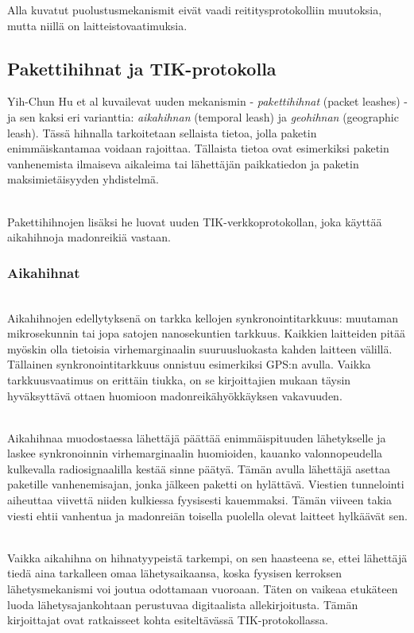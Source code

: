 \documentclass[finnish]{tktltiki2}
\theoremstyle{definition}
\theoremstyle{remark}
\begin{document}
Alla kuvatut puolustusmekanismit eivät vaadi reititysprotokolliin muutoksia, mutta niillä on laitteistovaatimuksia.

% 
% 
% 
% 
% 
% 
% 
% 

\subsection{Pakettihihnat ja TIK-protokolla}
\label{packetleashes}
% 
% 
% 
% 
% 
% 
% 
% 
% 
% 
Yih-Chun Hu et al \cite{leashes} kuvailevat uuden mekanismin - \emph{pakettihihnat} (packet leashes) - ja sen kaksi eri varianttia: \emph{aikahihnan} (temporal leash) ja \emph{geohihnan} (geographic leash). Tässä hihnalla tarkoitetaan sellaista tietoa, jolla paketin enimmäiskantamaa voidaan rajoittaa. Tällaista tietoa ovat esimerkiksi paketin vanhenemista ilmaiseva aikaleima tai lähettäjän paikkatiedon ja paketin maksimietäisyyden yhdistelmä.

\noindent \\
Pakettihihnojen lisäksi he luovat uuden TIK-verkkoprotokollan, joka käyttää aikahihnoja madonreikiä vastaan.

\subsubsection{Aikahihnat} 
\noindent \\
Aikahihnojen edellytyksenä on tarkka kellojen synkronointitarkkuus: muutaman mikrosekunnin tai jopa satojen nanosekuntien tarkkuus. Kaikkien laitteiden pitää myöskin olla tietoisia virhemarginaalin suuruusluokasta kahden laitteen välillä. Tällainen synkronointitarkkuus onnistuu esimerkiksi GPS:n avulla. Vaikka tarkkuusvaatimus on erittäin tiukka, on se kirjoittajien mukaan täysin hyväksyttävä ottaen huomioon madonreikähyökkäyksen vakavuuden.

\noindent \\
Aikahihnaa muodostaessa lähettäjä päättää enimmäispituuden lähetykselle ja laskee synkronoinnin virhemarginaalin huomioiden, kauanko valonnopeudella kulkevalla radiosignaalilla kestää sinne päätyä. Tämän avulla lähettäjä asettaa paketille vanhenemisajan, jonka jälkeen paketti on hylättävä. Viestien tunnelointi aiheuttaa viivettä niiden kulkiessa fyysisesti kauemmaksi. Tämän viiveen takia viesti ehtii vanhentua ja madonreiän toisella puolella olevat laitteet hylkäävät sen.

\noindent \\
Vaikka aikahihna on hihnatyypeistä tarkempi, on sen haasteena se, ettei lähettäjä tiedä aina tarkalleen omaa lähetysaikaansa, koska fyysisen kerroksen lähetysmekanismi voi joutua odottamaan vuoroaan. Täten on vaikeaa etukäteen luoda lähetysajankohtaan perustuvaa digitaalista allekirjoitusta. Tämän kirjoittajat ovat ratkaisseet kohta esiteltävässä TIK-protokollassa.
\end{document}
